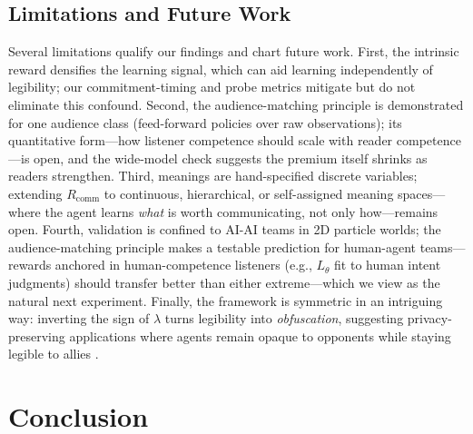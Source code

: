 \documentclass{article}
\newcommand{\Rcomm}{R_{\text{comm}}}
\newcommand{\Ltheta}{L_\theta}
\begin{document}
\subsection{Limitations and Future Work}
\label{ssec:limitations}

Several limitations qualify our findings and chart future work. First, the intrinsic reward densifies the learning signal, which can aid learning independently of legibility; our commitment-timing and probe metrics mitigate but do not eliminate this confound. Second, the audience-matching principle is demonstrated for one audience class (feed-forward policies over raw observations); its quantitative form---how listener competence should scale with reader competence---is open, and the wide-model check suggests the premium itself shrinks as readers strengthen. Third, meanings are hand-specified discrete variables; extending $\Rcomm$ to continuous, hierarchical, or self-assigned meaning spaces---where the agent learns \emph{what} is worth communicating, not only how---remains open. Fourth, validation is confined to AI-AI teams in 2D particle worlds; the audience-matching principle makes a testable prediction for human-agent teams---rewards anchored in human-competence listeners (e.g., $\Ltheta$ fit to human intent judgments) should transfer better than either extreme---which we view as the natural next experiment. Finally, the framework is symmetric in an intriguing way: inverting the sign of $\lambda$ turns legibility into \emph{obfuscation}, suggesting privacy-preserving applications where agents remain opaque to opponents while staying legible to allies \cite{strouse2018learning}.

\section{Conclusion}
\label{sec:conclusion}
\end{document}
